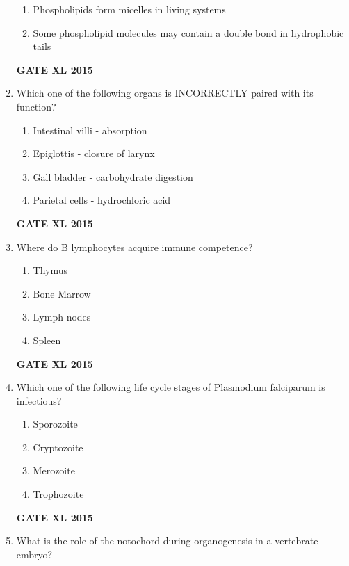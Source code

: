 \documentclass[journal,12pt,onecolumn]{IEEEtran}
\begin{document}
\begin{enumerate}
\begin{enumerate}
	    \item Phospholipids form micelles in living systems
            \item Some phospholipid molecules may contain a double bond in hydrophobic tails
    \end{enumerate}
\begin{flushright}\textbf{GATE XL 2015}\end{flushright}
\item Which one of the following organs is INCORRECTLY paired with its function?
    \begin{enumerate}
            \item  Intestinal villi - absorption
	    \item Epiglottis - closure of larynx
	    \item Gall bladder - carbohydrate digestion
            \item Parietal cells - hydrochloric acid
    \end{enumerate}
\begin{flushright}\textbf{GATE XL 2015}\end{flushright}
\item Where do B lymphocytes acquire immune competence?
    \begin{enumerate}
            \item Thymus 
	    \item Bone Marrow
	    \item Lymph nodes
            \item Spleen
    \end{enumerate}
\begin{flushright}\textbf{GATE XL 2015}\end{flushright}
\item Which one of the following life cycle stages of Plasmodium falciparum is infectious?
    \begin{enumerate}
            \item Sporozoite
	    \item Cryptozoite
	    \item Merozoite
            \item Trophozoite
    \end{enumerate}
\begin{flushright}\textbf{GATE XL 2015}\end{flushright}
\item What is the role of the notochord during organogenesis in a vertebrate embryo?
    \begin{enumerate}

\end{enumerate}
\end{enumerate}
\end{document}
